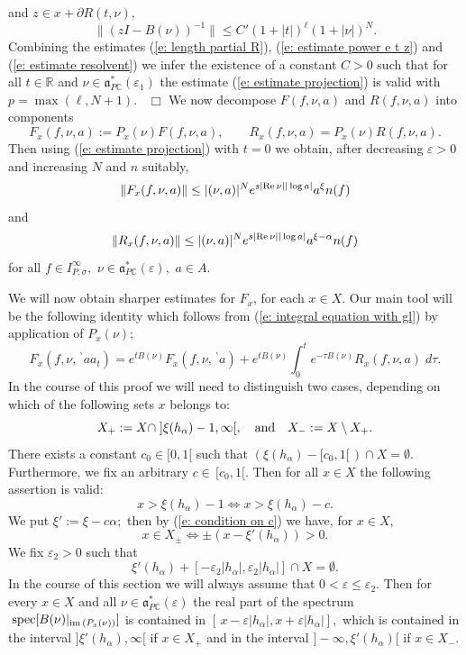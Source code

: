 \documentclass[12pt,a4paper]{article}
\def\qed{~\hfill\hbox{$\Box$}\medbreak}
\def\qquad{\quad\quad}
\def\msy#1{{\mathbb #1}}
\def\C{{\msy C}}
\def\R{{\msy R}}
\def\ga{\alpha}
\def\ge{\varepsilon}
\def\gs{\sigma}
\def\got#1{\mathfrak #1}
\def\fa{{\got a}}
\def\Re{{\rm Re}\,}
\def\iC{{\scriptscriptstyle \C}}
\numberwithin{Thm}{section}
\numberwithin{equation}{section}
\def\faPdc{{\fa_{P\iC}^*}}
\numberwithin{equation}{section}
\def\bp{\!{\,}^\backprime}
\def\spec{{\rm spec}}
\def\faPdc{\fa_{P\iC}^*}
\def\snorm{n}
\def\IPgs{I_{P,\gs}^\infty}
\def\spec{{\rm spec}}
\def\xx{x}
\def\xxi{\xi}
\begin{document}
and $z \in \xx + \partial R(t,\nu),$ 
\begin{equation}
\label{e: estimate resolvent}
\|(zI - B(\nu))^{-1}\|   \leq C' (1 + |t|)^\ell (1 +|\nu|)^N.
\end{equation} 
Combining the estimates (\ref{e: length partial R}), (\ref{e: estimate power e t z})
and (\ref{e: estimate resolvent}) we infer the existence of a constant $C > 0$ 
such that for all $t \in \R$ and $\nu \in \faPdc(\ge_1)$ the estimate 
(\ref{e: estimate projection}) is valid with $ p = \max (\ell , N+1).$ 
\qed
%
We now decompose $F(f, \nu, a)$ and $R(f,\nu, a)$ into components
$$ 
F_\xx (f, \nu, a) := P_\xx(\nu) F(f, \nu, a) , \qquad  R_\xx (f, \nu, a) = P_\xx(\nu) R(f, \nu, a).
$$ 
Then using (\ref{e: estimate projection}) with $t = 0$ we obtain, after decreasing $\ge >0$ 
and increasing $N$ and $\snorm$ suitably, 
$$ 
\|F_\xx(f, \nu, a) \| \leq  |(\nu,a)|^N e^{s|\Re  \nu||\log a|}a^\xxi \snorm(f)
$$ 
and
$$ 
\|R_\xx(f, \nu, a) \| \leq  |(\nu,a)|^N e^{s|\Re \nu||\log a|}a^{\xxi- \ga} \snorm(f)
$$ 
for all $f \in \IPgs,$ $\nu\in \faPdc(\ge),$ $a \in A$. 

We will now obtain sharper estimates for $F_\xx$, for each $\xx \in X. $ 
Our main tool will be the following identity which follows from  (\ref{e: integral equation with gl}) by application
of $P_\xx(\nu);$ 
\begin{equation}
\label{e: integral equation with gl and xi}
F_\xx(f,\nu, \bp aa_t) = e^{tB(\nu)} F_\xx(f,\nu, \bp a) + e^{tB(\nu)} \int_0^t e^{-\tau B(\nu)} R_\xx(f, \nu, a)\; d\tau.
\end{equation}
In the course of this proof we will need to distinguish two cases, depending 
on which of the following sets $\xx$ belongs to:
\begin{equation}
\label{e: defi X pm} 
X_+ : = X \cap \; ]\xxi(h_\ga) - 1, \infty[, \quad{\rm and} \quad X_- :=X\setminus X_+.
\end{equation}
There exists a constant $c_0 \in [0,1[$ such that $(\xxi(h_\ga) - [c_0, 1[\,)  \cap X = \emptyset.$ 
Furthermore, we fix an arbitrary $c\in \, [c_0 ,1[.$  Then for all $\xx \in X$ the following
assertion is valid:
\begin{equation}
\label{e: condition on c}
\xx > \xxi(h_\ga) - 1  \iff   \xx > \xxi(h_\ga) - c.
\end{equation}
We put $\xxi':= \xxi - c\ga;$ then by (\ref{e: condition on c})
we have,
for $\xx \in X,$  
$$ 
\xx \in X_\pm  \iff \pm(\xx -  \xxi'(h_\ga)) > 0.
$$ 
We fix $\ge_2> 0$ such that 
$$
\xxi'(h_\ga) + [-\ge_2|h_\ga|, \ge_2|h_\ga|] \cap X = \emptyset.
$$ 
In the course of this section we will always assume that  $0< \ge \leq \ge_2.$ Then for 
every $\xx \in X$ and all $\nu \in \faPdc(\ge)$ the real part of the spectrum  $\;\spec [B(\nu)|_{{\rm im}\,(P_\xx(\nu) )}]$ 
is contained in $[\, \xx-\ge|h_\ga|, \xx + \ge|h_\ga|],$ which is contained
in the interval $] \xxi'(h_\ga) , \infty[$ if $\xx \in X_+$ and in 
 the interval 
$]-\infty, \xxi'(h_\ga)[$ if $\xx \in X_-$.
\end{document}
